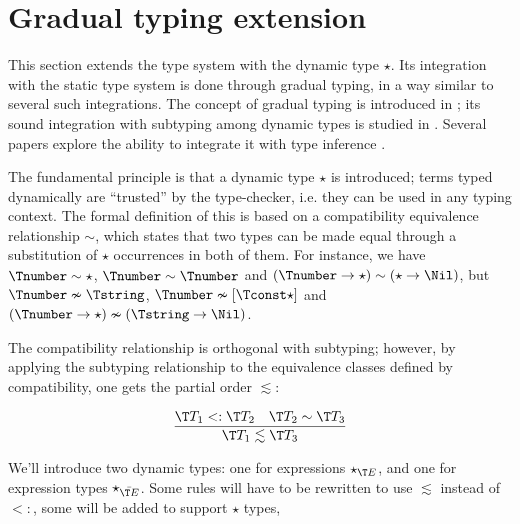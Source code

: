 
\section{Gradual typing extension}

This section extends the type system with the dynamic type
$\star$. Its integration with the static type system is done through
gradual typing, in a way similar to several such integrations. The
concept of gradual typing is introduced in \cite{XXX}; its sound
integration with subtyping among dynamic types is studied in
\cite{XXX}. Several papers explore the ability to integrate it with
type inference \cite{xxx}\cite{xxx}.

The fundamental principle is that a dynamic type $\star$ is
introduced; terms typed dynamically are ``trusted'' by the
type-checker, i.e. they can be used in any typing context. The formal
definition of this is based on a compatibility equivalence
relationship $\sim$, which states that two types can be made equal
through a substitution of $\star$ occurrences in both of them. For
instance, we have $\Tnumber\sim\star$, $\Tnumber\sim\Tnumber$ and
$(\Tnumber\rightarrow\star)\sim(\star\rightarrow\Nil)$, but
$\Tnumber\nsim\Tstring$, $\Tnumber\nsim[\Tconst \star]$ and
$(\Tnumber\rightarrow\star)\nsim(\Tstring\rightarrow\Nil)$.

The compatibility relationship is orthogonal with subtyping; however,
by applying the subtyping relationship to the equivalence classes
defined by compatibility, one gets the partial order $\lesssim$: 

$$
\frac{
\T T_1 <: \T T_2
\quad
\T T_2 \sim \T T_3
}{
\T T_1 \lesssim \T T_3
}
$$

We'll introduce two dynamic types: one for expressions $\star_{\T E}$,
and one for expression types $\star_{\bar{\T E}}$. Some rules will
have to be rewritten to use $\lesssim$ instead of $<:$, some will be
added to support $\star$ types,
